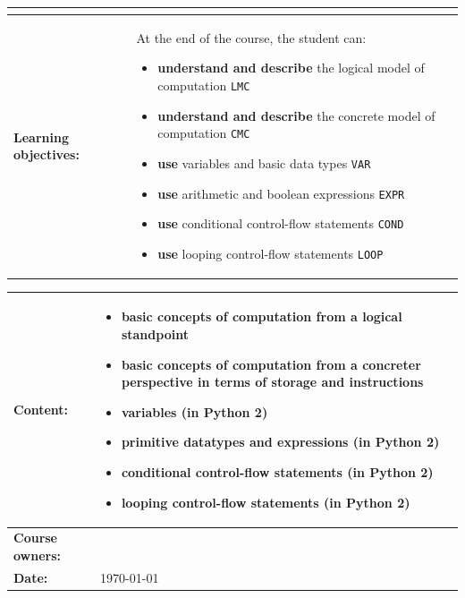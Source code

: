 \begin{tabularx}{\textwidth}{|>{\columncolor{lichtGrijs}} p{}|X|}
\begin{center}
	\end{center}\\
	\hline
	\textbf{Learning objectives:} &
		At the end of the course, the student can:
			\begin{itemize}
				\item \textbf{understand and describe} the logical model of computation \texttt{LMC}
				\item \textbf{understand and describe} the concrete model of computation \texttt{CMC}
				\item \textbf{use} variables and basic data types \texttt{VAR}
				\item \textbf{use} arithmetic and boolean expressions \texttt{EXPR}
				\item \textbf{use} conditional control-flow statements \texttt{COND}
				\item \textbf{use} looping control-flow statements \texttt{LOOP}
			\end{itemize} \\
		
	\hline
\end{tabularx}
\newpage

\begin{tabularx}{\textwidth}{|>{\columncolor{lichtGrijs}} p{}|X|}
	\hline
	\textbf{Content:}&
	\begin{itemize}
		\item basic concepts of computation from a logical standpoint
		\item basic concepts of computation from a concreter perspective in terms of storage and instructions
		\item variables (in Python 2)
		\item primitive datatypes and expressions (in Python 2)
		\item conditional control-flow statements (in Python 2)
		\item looping control-flow statements (in Python 2)
	\end{itemize} \\
	\hline
	\textbf{Course owners:} & \author\\
	\hline
	\textbf{Date:} & \today \\
	\hline
\end{tabularx}
\newpage
